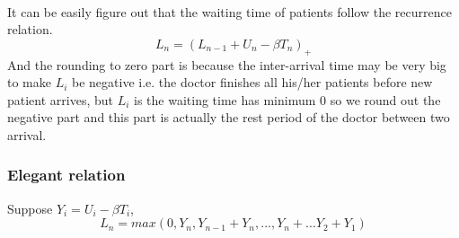 \documentclass[project2.tex]{subfiles}
\begin{document}
\paragraph{}
It can be easily figure out that the waiting time of patients follow the recurrence relation.
$$L_n=(L_{n-1}+U_n-\beta T_n)_+$$
And the rounding to zero part is because the inter-arrival time may be very big to make $L_i$ be negative i.e. the doctor finishes all his/her patients before new patient arrives, but $L_i$ is the waiting time has minimum 0 so we round out the negative part and this part is actually the rest period of the doctor between two arrival.
\subsubsection{Elegant relation}
\begin{lemma}
Suppose $Y_i=U_i-\beta T_i$,
$$L_n=max(0,Y_n,Y_{n-1}+Y_n,...,Y_n+...Y_2+Y_1)$$
\end{lemma}
\end{document}
